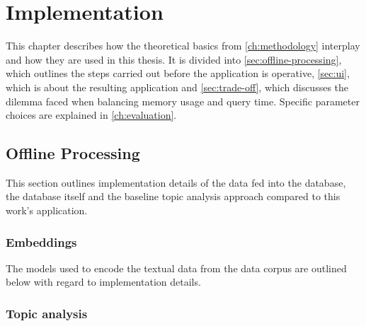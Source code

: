 \chapter{Implementation}\label{ch:implementation}

This chapter describes how the theoretical basics from \autoref{ch:methodology} interplay and how they are used in this thesis.
It is divided into \autoref{sec:offline-processing}, which outlines the steps carried out before the application is operative, 
\autoref{sec:ui}, which is about the resulting application and \autoref{sec:trade-off}, which discusses the dilemma faced when balancing memory usage and query time. 
Specific parameter choices are explained in \autoref{ch:evaluation}.


\section{Offline Processing}\label{sec:offline-processing}
This section outlines implementation details of the data fed into the database, the database itself and the baseline topic analysis approach compared to this work's application.




\subsection{Embeddings}\label{subsec:impl-embeddings}
The models used to encode the textual data from the data corpus are outlined below with regard to implementation details.















\subsection{Topic analysis}\label{impl-topic-modeling}

